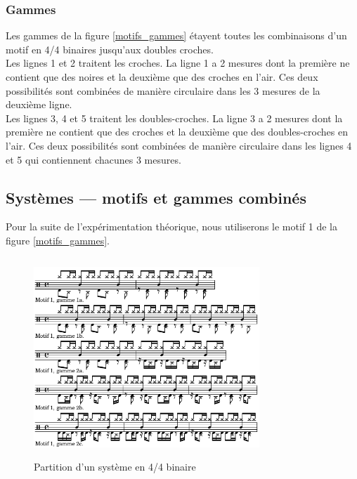 \subsubsection{Gammes}
Les gammes de la figure \ref{motifs_gammes} étayent toutes les combinaisons d’un motif en 4/4 binaires jusqu’aux doubles croches.\\
Les lignes 1 et 2 traitent les croches. La ligne 1 a 2 mesures dont la première ne contient que des noires et la deuxième que des croches en l’air. Ces deux possibilités sont combinées de manière circulaire dans les 3 mesures de la deuxième ligne.\\
Les lignes 3, 4 et 5 traitent les doubles-croches. La ligne 3 a 2 mesures dont la première ne contient que des croches et la deuxième que des doubles-croches en l’air. Ces deux possibilités sont combinées de manière circulaire dans les lignes 4 et 5 qui contiennent chacunes 3 mesures.
\subsection*{Systèmes — motifs et gammes combinés}
Pour la suite de l’expérimentation théorique, nous utiliserons le motif 1 de la figure \ref{motifs_gammes}.\\
\begin{figure}[h]
	\centering
	\includegraphics[height=75mm, width=85mm]{z_images/4_experimentations/2_experimentation_theorique/2_systeme_4-4_binaire.png}
	\caption{Partition d’un système en 4/4 binaire}
	\label{sys_binaire}
\end{figure}
